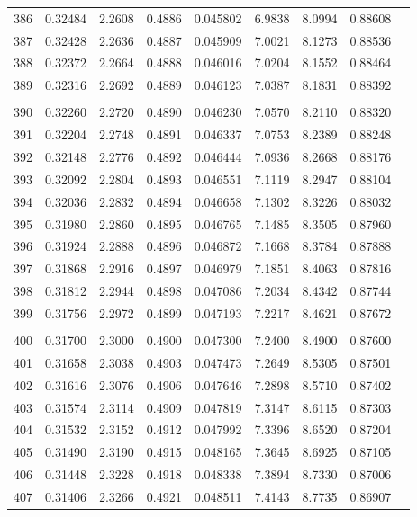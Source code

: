 \documentclass[letter,twosides,10pt]{article}
\begin{document}
\begin{longtable}{|c|c|c|c|c|c|c|c|c|}
386 & 0.32484 & 2.2608 & 0.4886 & 0.045802 & 6.9838 &  8.0994 & 0.88608 \\
387 & 0.32428 & 2.2636 & 0.4887 & 0.045909 & 7.0021 &  8.1273 & 0.88536 \\
388 & 0.32372 & 2.2664 & 0.4888 & 0.046016 & 7.0204 &  8.1552 & 0.88464 \\
389 & 0.32316 & 2.2692 & 0.4889 & 0.046123 & 7.0387 &  8.1831 & 0.88392 \\
 & & & & & & & \\
390 & 0.32260 & 2.2720 & 0.4890 & 0.046230 & 7.0570 &  8.2110 & 0.88320 \\
391 & 0.32204 & 2.2748 & 0.4891 & 0.046337 & 7.0753 &  8.2389 & 0.88248 \\
392 & 0.32148 & 2.2776 & 0.4892 & 0.046444 & 7.0936 &  8.2668 & 0.88176 \\
393 & 0.32092 & 2.2804 & 0.4893 & 0.046551 & 7.1119 &  8.2947 & 0.88104 \\
394 & 0.32036 & 2.2832 & 0.4894 & 0.046658 & 7.1302 &  8.3226 & 0.88032 \\
395 & 0.31980 & 2.2860 & 0.4895 & 0.046765 & 7.1485 &  8.3505 & 0.87960 \\
396 & 0.31924 & 2.2888 & 0.4896 & 0.046872 & 7.1668 &  8.3784 & 0.87888 \\
397 & 0.31868 & 2.2916 & 0.4897 & 0.046979 & 7.1851 &  8.4063 & 0.87816 \\
398 & 0.31812 & 2.2944 & 0.4898 & 0.047086 & 7.2034 &  8.4342 & 0.87744 \\
399 & 0.31756 & 2.2972 & 0.4899 & 0.047193 & 7.2217 &  8.4621 & 0.87672 \\
 & & & & & & & \\
400 & 0.31700 & 2.3000 & 0.4900 & 0.047300 & 7.2400 &  8.4900 & 0.87600 \\
401 & 0.31658 & 2.3038 & 0.4903 & 0.047473 & 7.2649 &  8.5305 & 0.87501 \\
402 & 0.31616 & 2.3076 & 0.4906 & 0.047646 & 7.2898 &  8.5710 & 0.87402 \\
403 & 0.31574 & 2.3114 & 0.4909 & 0.047819 & 7.3147 &  8.6115 & 0.87303 \\
404 & 0.31532 & 2.3152 & 0.4912 & 0.047992 & 7.3396 &  8.6520 & 0.87204 \\
405 & 0.31490 & 2.3190 & 0.4915 & 0.048165 & 7.3645 &  8.6925 & 0.87105 \\
406 & 0.31448 & 2.3228 & 0.4918 & 0.048338 & 7.3894 &  8.7330 & 0.87006 \\
407 & 0.31406 & 2.3266 & 0.4921 & 0.048511 & 7.4143 &  8.7735 & 0.86907 \\

\end{longtable}
\end{document}

